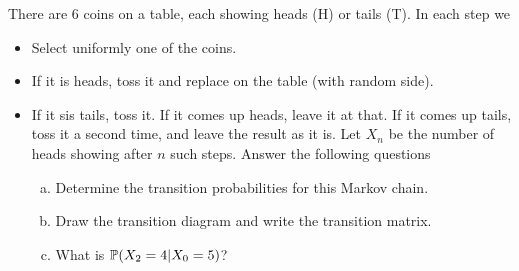 \begin{problem}
	There are 6 coins on a table, each showing heads (H) or tails (T). In each step we 
	\begin{itemize}
		\item Select uniformly one of the coins. 
		\item If it is heads, toss it and replace on the table (with random side).
		\item If it sis tails, toss it. If it comes up heads, leave it at that. If it comes up tails, toss it a second time, and leave the result as it is.
		Let $X_n$ be the number of heads showing after $n$ such steps. Answer the following questions
		\begin{enumerate}[(a)]
			\item Determine the transition probabilities for this Markov chain.
			\item Draw the transition diagram and write the transition matrix.
			\item What is $\mathbb{P}(X_2 = 4| X_0=5)$?
		\end{enumerate}
	\end{itemize}
\end{problem}

